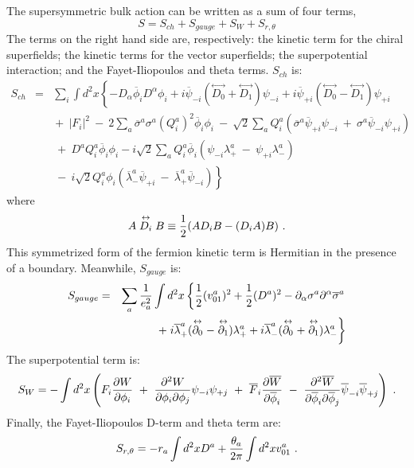 \documentclass[a4paper,12pt]{article}
\begin{document}
The supersymmetric bulk action can be written as a sum of four terms, 
\begin{equation}
S=S_{ch}+S_{gauge}+S_{W}+S_{r,\theta}
\label{bulkaction}
\end{equation}
The terms on the right hand side are, respectively: the kinetic term for
the chiral superfields; the kinetic terms for the vector superfields; the
superpotential interaction; and the Fayet-Iliopoulos and theta terms. 
$S_{ch}$ is: 
\begin{eqnarray}
S_{ch}&=&\sum_i\int d^2x \left\{ 
- D_{\alpha}\overline{\phi}_i D^{\alpha} \phi_i
+i \overline{\psi}_{-i}( \stackrel{\leftrightarrow}{D_0}
+\stackrel{\leftrightarrow}{D_1})\psi_{-i} \right.
+i \overline{\psi}_{+i}
( \stackrel{\leftrightarrow}{D_0}
-\stackrel{\leftrightarrow}{D_1})
\psi_{+i} \nonumber \\
& & \mbox{}+~|F_i|^2 ~-~2\sum_a\overline{\sigma}^a\sigma^a 
(Q_i^a)^2\overline{\phi}_i
\phi_i~-~\sqrt{2}\sum_a Q_i^a(\overline{\sigma}^a\overline{\psi}_{+i}\psi_{-i}~
+~\sigma^a
\overline{\psi}_{-i}\psi_{+i}) \nonumber \\ 
& & \mbox{}~+~D^aQ_i^a\overline{\phi}_i\phi_i 
-i\sqrt{2}\sum_aQ_i^a\overline{\phi}_i(\psi_{-i}
\lambda_+^a~-~\psi_{+i} \lambda_-^a) \nonumber\\
& & \left. \mbox{}~-~i \sqrt{2}Q_i^a\phi_i
(\overline{\lambda}_-^a
\overline{\psi}_{+i}~-~\overline{\lambda}_+^a\overline{\psi}_{-i} ) 
\right\}
\label{kechiral}
\end{eqnarray}
where
\begin{equation}
	A \stackrel{\leftrightarrow}{D_i} B \equiv 
	{1\over2} (A D_i B - (D_iA)B)\ .
\label{symder}
\end{equation}
This symmetrized form of the fermion kinetic term
is Hermitian in the presence of a boundary.
Meanwhile, $S_{gauge}$ is:
\begin{eqnarray}
S_{gauge}&=&\sum_a{1 \over e_a^2}\int d^2x\left\{{1 \over 2}(v_{01}^a)^2 + 
{1 \over 2}(D^a)^2 - \partial_{\alpha}\sigma^a \partial^{\alpha} 
\overline{\sigma}^a \right.  \nonumber \\
&&+  \left. i \overline{\lambda}_+^a
(\stackrel{\leftrightarrow}{\partial_0}-
\stackrel{\leftrightarrow}{\partial_1})
\lambda_+^a +i \overline{\lambda}_-^a
(\stackrel{\leftrightarrow}{\partial_0}+
\stackrel{\leftrightarrow}{\partial_1})
\lambda_-^a \right\}
\label{kevector}
\end{eqnarray}
The superpotential term is:
\begin{equation}
S_W=-\int d^2x \left( F_i {\partial W \over \partial
\phi_i}~+~{\partial^2 W \over \partial \phi_i\partial\phi_j} \psi_{-i}
\psi_{+j}~+~{\overline F}_i
{\partial \overline{W} \over \partial \overline{\phi}_i}~-~{\partial^2
\overline{W}
\over
\partial\overline{\phi}_i\partial\overline{\phi}_j}
\overline{\psi}_{-i}\overline{\psi}_{+j}
\right)\ .
\label{superpot}
\end{equation}
Finally, the Fayet-Iliopoulos D-term and theta term are:
\begin{equation}
S_{r, \theta}=-r_a\int d^2x D^a+{\theta_a\over 2 \pi} \int d^2 x
v_{01}^a\ .
\label{fid}
\end{equation}
\end{document}
